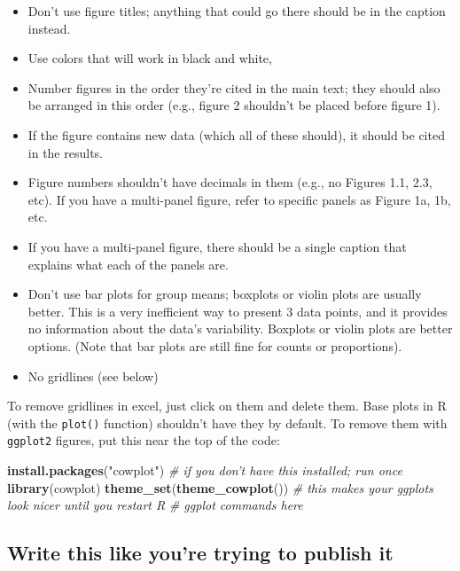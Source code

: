 \documentclass[]{book}
\newenvironment{Shaded}{\begin{snugshade}}{\end{snugshade}}
\newcommand{\KeywordTok}[1]{\textcolor[rgb]{0.13,0.29,0.53}{\textbf{#1}}}
\newcommand{\StringTok}[1]{\textcolor[rgb]{0.31,0.60,0.02}{#1}}
\newcommand{\CommentTok}[1]{\textcolor[rgb]{0.56,0.35,0.01}{\textit{#1}}}
\newcommand{\NormalTok}[1]{#1}
\providecommand{\tightlist}{%
  \setlength{\itemsep}{0pt}\setlength{\parskip}{0pt}}
\begin{document}
\begin{itemize}
\tightlist
\item
  Don't use figure titles; anything that could go there should be in the
  caption instead.
\item
  Use colors that will work in black and white,
\item
  Number figures in the order they're cited in the main text; they
  should also be arranged in this order (e.g., figure 2 shouldn't be
  placed before figure 1).
\item
  If the figure contains new data (which all of these should), it should
  be cited in the results.
\item
  Figure numbers shouldn't have decimals in them (e.g., no Figures 1.1,
  2.3, etc). If you have a multi-panel figure, refer to specific panels
  as Figure 1a, 1b, etc.
\item
  If you have a multi-panel figure, there should be a single caption
  that explains what each of the panels are.
\item
  Don't use bar plots for group means; boxplots or violin plots are
  usually better. This is a very inefficient way to present 3 data
  points, and it provides no information about the data's variability.
  Boxplots or violin plots are better options. (Note that bar plots are
  still fine for counts or proportions).
\item
  No gridlines (see below)
\end{itemize}

To remove gridlines in excel, just click on them and delete them. Base
plots in R (with the \texttt{plot()} function) shouldn't have they by
default. To remove them with \texttt{ggplot2} figures, put this near the
top of the code:

\begin{Shaded}
\begin{Highlighting}[]
\KeywordTok{install.packages}\NormalTok{(}\StringTok{"cowplot"}\NormalTok{) }\CommentTok{# if you don't have this installed; run once}
\KeywordTok{library}\NormalTok{(cowplot)}
\KeywordTok{theme_set}\NormalTok{(}\KeywordTok{theme_cowplot}\NormalTok{()) }\CommentTok{# this makes your ggplots look nicer until you restart R}
\CommentTok{# ggplot commands here}
\end{Highlighting}
\end{Shaded}

\subsection{Write this like you're trying to publish
it}\label{write-this-like-youre-trying-to-publish-it}
\end{document}

